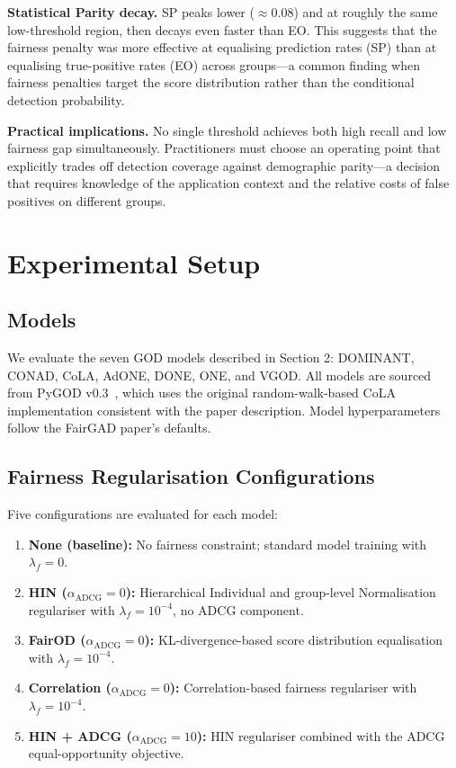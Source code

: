 \documentclass[sigconf,natbib=false]{acmart}
\begin{document}
\textbf{Statistical Parity decay.} SP peaks lower ($\approx 0.08$) and at roughly the same low-threshold region, then decays even faster than EO. This suggests that the fairness penalty was more effective at equalising prediction rates (SP) than at equalising true-positive rates (EO) across groups—a common finding when fairness penalties target the score distribution rather than the conditional detection probability.

\textbf{Practical implications.} No single threshold achieves both high recall and low fairness gap simultaneously. Practitioners must choose an operating point that explicitly trades off detection coverage against demographic parity—a decision that requires knowledge of the application context and the relative costs of false positives on different groups.

\section{Experimental Setup}

\subsection{Models}

We evaluate the seven GOD models described in Section 2: DOMINANT, CONAD, CoLA, AdONE, DONE, ONE, and VGOD. All models are sourced from PyGOD v0.3~\cite{neoFairGraphAnomaly2024a}, which uses the original random-walk-based CoLA implementation consistent with the paper description. Model hyperparameters follow the FairGAD paper's defaults.

\subsection{Fairness Regularisation Configurations}

Five configurations are evaluated for each model:

\begin{enumerate}[leftmargin=*]
    \item \textbf{None (baseline):} No fairness constraint; standard model training with $\lambda_f = 0$.
    \item \textbf{HIN ($\alpha_{\text{ADCG}} = 0$):} Hierarchical Individual and group-level Normalisation regulariser with $\lambda_f = 10^{-4}$, no ADCG component.
    \item \textbf{FairOD ($\alpha_{\text{ADCG}} = 0$):} KL-divergence-based score distribution equalisation with $\lambda_f = 10^{-4}$.
    \item \textbf{Correlation ($\alpha_{\text{ADCG}} = 0$):} Correlation-based fairness regulariser with $\lambda_f = 10^{-4}$.
    \item \textbf{HIN + ADCG ($\alpha_{\text{ADCG}} = 10$):} HIN regulariser combined with the ADCG equal-opportunity objective.
\end{enumerate}
\end{document}
